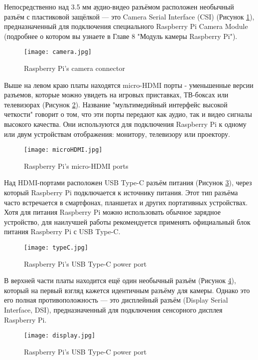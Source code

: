 Непосредственно над 3.5 мм аудио-видео разъёмом расположен необычный разъём с пластиковой защёлкой — это Camera Serial Interface (CSI) (Рисунок \ref{fig:camera}), предназначенный для подключения специального Raspberry Pi Camera Module (подробнее о котором вы узнаете в Главе 8 "Модуль камеры Raspberry Pi").

\begin{figure}[H]
	\centering
	\texttt{[image: camera.jpg]}
	\caption{Raspberry Pi’s camera connector}
	\label{fig:camera}
\end{figure}

Выше на левом краю платы находятся micro-HDMI порты - уменьшенные версии разъемов, которые можно увидеть на игровых приставках, ТВ-боксах или телевизорах (Рисунок \ref{fig:microHDMI}). Название "мультимедийный интерфейс высокой четкости" говорит о том, что эти порты передают как аудио, так и видео сигналы высокого качества. Они используются для подключения Raspberry Pi к одному или двум устройствам отображения: монитору, телевизору или проектору.

\begin{figure}[H]
	\centering
	\texttt{[image: microHDMI.jpg]}
	\caption{Raspberry Pi’s micro-HDMI ports}
	\label{fig:microHDMI}
\end{figure}

Над HDMI-портами расположен USB Type-C разъём питания (Рисунок \ref{fig:typeC}), через который Raspberry Pi подключается к источнику питания. Этот тип разъёма часто встречается в смартфонах, планшетах и других портативных устройствах. Хотя для питания Raspberry Pi можно использовать обычное зарядное устройство, для наилучшей работы рекомендуется применять официальный блок питания Raspberry Pi с USB Type-C.

\begin{figure}[H]
	\centering
	\texttt{[image: typeC.jpg]}
	\caption{Raspberry Pi’s USB Type-C power port}
	\label{fig:typeC}
\end{figure}

В верхней части платы находится ещё один необычный разъём (Рисунок \ref{fig:display}), который на первый взгляд кажется идентичным разъёму для камеры. Однако это его полная противоположность — это дисплейный разъём (Display Serial Interface, DSI), предназначенный для подключения сенсорного дисплея Raspberry Pi.

\begin{figure}[H]
	\centering
	\texttt{[image: display.jpg]}
	\caption{Raspberry Pi’s USB Type-C power port}
	\label{fig:display}
\end{figure}

